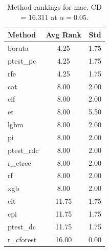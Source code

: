 \begin{table}[h]
\centering
\caption{Method rankings for mae. CD = 16.311 at $\alpha=0.05$.}
\label{tab:ranks_mae}
\begin{tabular}{lcc}
\toprule
Method & Avg Rank & Std \\
\midrule
boruta & 4.25 & 1.75 \\
ptest_pc & 4.25 & 1.75 \\
rfe & 4.25 & 1.75 \\
cat & 8.00 & 2.00 \\
cif & 8.00 & 2.00 \\
et & 8.00 & 5.50 \\
lgbm & 8.00 & 2.00 \\
pi & 8.00 & 2.00 \\
ptest_rdc & 8.00 & 2.00 \\
r_ctree & 8.00 & 2.00 \\
rf & 8.00 & 2.00 \\
xgb & 8.00 & 2.00 \\
cit & 11.75 & 1.75 \\
cpi & 11.75 & 1.75 \\
ptest_dc & 11.75 & 1.75 \\
r_cforest & 16.00 & 0.00 \\
\bottomrule
\end{tabular}
\end{table}